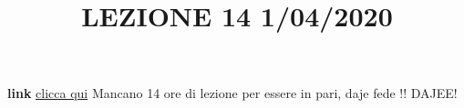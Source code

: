 \newline
\newline
\title{LEZIONE 14 1/04/2020}\newline
\textbf{link} \href{https://web.microsoftstream.com/video/7cfe3714-fd1e-453f-8394-f7abd4d747ad?list=user&userId=faa91214-a6f5-40d7-8875-253fd49b8ce1}{clicca qui} \newline
Mancano 14 ore di lezione per essere in pari, daje fede !! DAJEE!